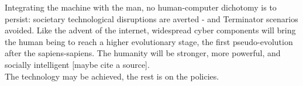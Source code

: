 Integrating the machine with the man, no human-computer dichotomy is to persist: societary technological disruptions are averted - and Terminator scenarios avoided. Like the advent of the internet, widespread cyber components will bring the human being to reach a higher evolutionary stage, the first pseudo-evolution after the sapiens-sapiens. The humanity will be stronger, more powerful, and socially intelligent [maybe cite a source].\\

The technology may be achieved, the rest is on the policies.

